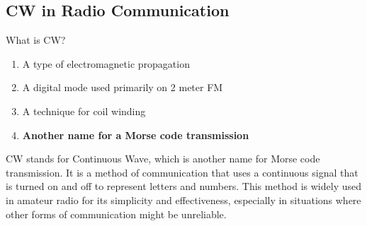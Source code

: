 \subsection{CW in Radio Communication}
\label{T8D09}

\begin{tcolorbox}[colback=gray!10!white,colframe=black!75!black,title=T8D09]
What is CW?
\begin{enumerate}[noitemsep]
    \item A type of electromagnetic propagation
    \item A digital mode used primarily on 2 meter FM
    \item A technique for coil winding
    \item \textbf{Another name for a Morse code transmission}
\end{enumerate}
\end{tcolorbox}

CW stands for Continuous Wave, which is another name for Morse code transmission. It is a method of communication that uses a continuous signal that is turned on and off to represent letters and numbers. This method is widely used in amateur radio for its simplicity and effectiveness, especially in situations where other forms of communication might be unreliable.